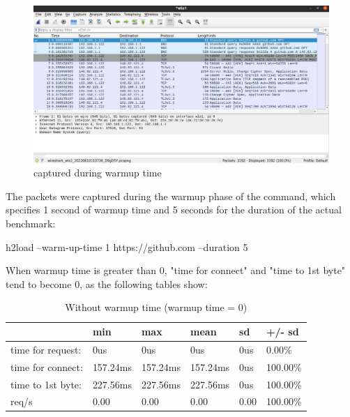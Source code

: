 \documentclass[a4paper,10pt]{article}
\begin{document}
\begin{figure}[h!]
\centering
\includegraphics[scale=0.2]{h2load-wireshark}
\caption{captured during warmup time}
\label{fig:figure1}
\end{figure}


The packets were captured during the warmup phase of the command, which specifies 1 second of warmup time and 5 seconds for the duration of the actual benchmark:


h2load --warm-up-time 1 https://github.com --duration 5 


When warmup time is greater than 0, "time for connect" and "time to 1st byte" tend to become 0, as the following tables show:


\begin{table}[h!]
\centering
\begin{tabular}{|l|l|l|l|l|l|}
\hline
                  & min      & max      & mean     & sd   & +/- sd   \\ \hline
time for request: & 0us      & 0us      & 0us      & 0us  & 0.00\%   \\ \hline
time for connect: & 157.24ms & 157.24ms & 157.24ms & 0us  & 100.00\% \\ \hline
time to 1st byte: & 227.56ms & 227.56ms & 227.56ms & 0us  & 100.00\% \\ \hline
req/s             & 0.00     & 0.00     & 0.00     & 0.00 & 100.00\% \\ \hline
\end{tabular}

\caption{Without warmup time (warmup time = 0)}
\label{fig:table4}

\end{table}
\end{document}
